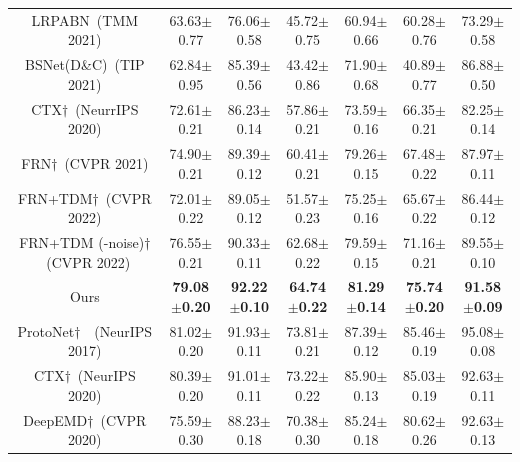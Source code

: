 \documentclass[letterpaper]{article} %
\begin{document}
\begin{table}[!ht]
\begin{tabular}{ccccccc}
LRPABN~(TMM 2021)%
& 63.63$\pm$0.77
& 76.06$\pm$0.58
& 45.72$\pm$0.75
& 60.94$\pm$0.66
& 60.28$\pm$0.76
& 73.29$\pm$0.58 \\


BSNet(D\&C)~(TIP 2021)%
& 62.84$\pm$0.95
& 85.39$\pm$0.56
& 43.42$\pm$0.86
& 71.90$\pm$0.68
& 40.89$\pm$0.77
& 86.88$\pm$0.50 \\ 

CTX$\dag$~(NeurrIPS 2020)%
& 72.61$\pm$0.21
& 86.23$\pm$0.14
& 57.86$\pm$0.21
& 73.59$\pm$0.16
& 66.35$\pm$0.21
& 82.25$\pm$0.14 \\ 


FRN$\dag$~(CVPR 2021)%
& 74.90$\pm$0.21
& 89.39$\pm$0.12
& 60.41$\pm$0.21
& 79.26$\pm$0.15
& 67.48$\pm$0.22
& 87.97$\pm$0.11 \\ 

FRN+TDM$\dag$~(CVPR 2022)%
& 72.01$\pm$0.22        
& 89.05$\pm$0.12          
& 51.57$\pm$0.23
& 75.25$\pm$0.16     
& 65.67$\pm$0.22       
& 86.44$\pm$0.12  \\ 


FRN+TDM (-noise)$\dag$~(CVPR 2022)%
& 76.55$\pm$0.21        
& 90.33$\pm$0.11          
& 62.68$\pm$0.22       
& 79.59$\pm$0.15         
& 71.16$\pm$0.21    
& 89.55$\pm$0.10  \\ 



Ours 
& \textbf{79.08$\pm$0.20}
& \textbf{92.22$\pm$0.10}
& \textbf{64.74$\pm$0.22}
& \textbf{81.29$\pm$0.14}
& \textbf{75.74$\pm$0.20}
& \textbf{91.58$\pm$0.09} \\ \midrule

     

ProtoNet$\dag$~~(NeurIPS 2017)%
& 81.02$\pm$0.20      
& 91.93$\pm$0.11      
& 73.81$\pm$0.21      
& 87.39$\pm$0.12       
& 85.46$\pm$0.19         
& 95.08$\pm$0.08 \\ 


CTX$\dag$~(NeurIPS 2020)%
& 80.39$\pm$0.20
& 91.01$\pm$0.11
& 73.22$\pm$0.22
& 85.90$\pm$0.13
& 85.03$\pm$0.19
& 92.63$\pm$0.11 \\ 



DeepEMD$\dag$~(CVPR 2020)%
& 75.59$\pm$0.30
& 88.23$\pm$0.18
& 70.38$\pm$0.30
& 85.24$\pm$0.18
& 80.62$\pm$0.26
& 92.63$\pm$0.13  \\ 




\end{tabular}
\end{table}
\end{document}
